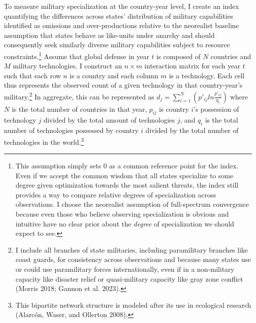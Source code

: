 \documentclass[
  12,
  letterpaper,
  DIV=11,
  numbers=noendperiod]{scrartcl}
\begin{document}
To measure military specialization at the country-year level, I create
an index quantifying the differences across states' distribution of
military capabilities identified as omissions and over-productions
relative to the neorealist baseline assumption that states behave as
like-units under anarchy and should consequently seek similarly diverse
military capabilities subject to resource constraints.\footnote{This
  assumption simply sets 0 as a common reference point for the index.
  Even if we accept the common wisdom that all states specialize to some
  degree given optimization towards the most salient threats, the index
  still provides a way to compare relative degrees of specialization
  across observations. I choose the neorealist assumption of
  full-spectrum convergence because even those who believe observing
  specialization is obvious and intuitive have no clear prior about the
  \emph{degree} of specialization we should expect to see.} Assume that
global defense in year \(t\) is composed of \(N\) countries and \(M\)
military technologies. I construct an \(n \times m\) interaction matrix
for each year \(t\) such that each row \(n\) is a country and each
column \(m\) is a technology. Each cell thus represents the observed
count of a given technology in that country-year's military.\footnote{I
  include all branches of state militaries, including paramilitary
  branches like coast guards, for consistency across observations and
  because many states use or could use paramilitary forces
  internationally, even if in a non-military capacity like disaster
  relief or quasi-military capacity like gray zone conflict (Morris
  2018; Gannon et al. 2023).} In aggregate, this can be represented as
\(d_j = \sum_{i=1}^{N}(p'_{ij}ln\frac{p'_{ij}}{q_i})\) where \(N\) is
the total number of countries in that year, \(p_{ij}\) is country
\(i\)'s possession of technology \(j\) divided by the total amount of
technologies \(j\), and \(q_i\) is the total number of technologies
possessed by country \(i\) divided by the total number of technologies
in the world.\footnote{This bipartite network structure is modeled after
  its use in ecological research (Alarcón, Waser, and Ollerton 2008).}
\end{document}
